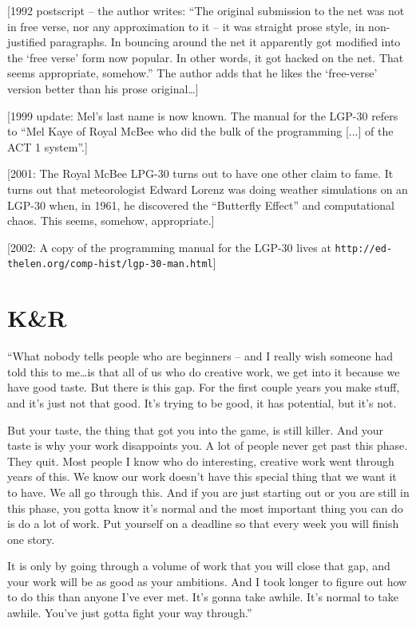 \documentclass[10pt,twoside,openright]{memoir}
\begin{document}
\vskip 0.4in

[1992 postscript -- the author writes: ``The original submission to the net was not in free verse, nor any approximation to it -- it was straight prose style, in non-justified paragraphs. In bouncing around the net it apparently got modified into the `free verse' form now popular. In other words, it got hacked on the net. That seems appropriate, somehow.'' The author adds that he likes the `free-verse' version better than his prose original\dots]

[1999 update: Mel's last name is now known. The manual for the LGP-30 refers to ``Mel Kaye of Royal McBee who did the bulk of the programming [...] of the ACT 1 system''.]

[2001: The Royal McBee LPG-30 turns out to have one other claim to fame. It turns out that meteorologist Edward Lorenz was doing weather simulations on an LGP-30 when, in 1961, he discovered the ``Butterfly Effect'' and computational chaos. This seems, somehow, appropriate.]

[2002: A copy of the programming manual for the LGP-30 lives at {\footnotesize \texttt{http://ed-thelen.org/comp-hist/lgp-30-man.html}}]


\chapter{K\&R}

``What nobody tells people who are beginners -- and I really wish someone had told this to me\dots is that all of us who do creative work, we get into it because we have good taste. But there is this gap. For the first couple years you make stuff, and it's just not that good. It's trying to be good, it has potential, but it's not.

But your taste, the thing that got you into the game, is still killer. And your taste is why your work disappoints you. A lot of people never get past this phase. They quit. Most people I know who do interesting, creative work went through years of this. We know our work doesn't have this special thing that we want it to have. We all go through this. And if you are just starting out or you are still in this phase, you gotta know it's normal and the most important thing you can do is do a lot of work. Put yourself on a deadline so that every week you will finish one story.

It is only by going through a volume of work that you will close that gap, and your work will be as good as your ambitions. And I took longer to figure out how to do this than anyone I've ever met. It's gonna take awhile. It's normal to take awhile. You've just gotta fight your way through.''
\end{document}
